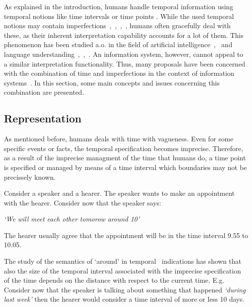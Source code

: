 %
%
As explained in the introduction, humans handle temporal information using temporal notions like time intervals or time points \cite{Dyreson1994}. While the used temporal notions may contain imperfections~\cite{Dev98},~\cite{Dubois:jucs_9_9:fuzziness_and_uncertainty_in},~\cite{nagypal2003},~\cite{Dubois89}, humans often gracefully deal with these, as their inherent interpretation capability accounts for a lot of them. This phenomenon has been studied a.o. in the field of artificial intelligence~\cite{Tre97},~\cite{5151} and language understanding~\cite{DeCaluwe:1997:FTI:285506.285516},~\cite{nagypal2003},~\cite{Dev98}. An information system, however, cannot appeal to a similar interpretation functionality. Thus, many proposals have been concerned with the combination of time and imperfections in the context of information systems~\cite{nagypal2003}. In this section, some main concepts and issues concerning this combination are presented.


\subsection{\label{subsec:representation}Representation}

As mentioned before, humans deals with time with vagueness. Even for some specific events or facts, the temporal specification becomes imprecise. Therefore, as a result of the imprecise managment of the time that humans do, a time point is specified or managed by means of a time interval which boundaries may not be precissely known.

\begin{example}
Consider a speaker and a hearer. The speaker wants to make an appointment with the hearer. Consider now that the speaker says:\\
\begin{center}
\emph{`We will meet each other tomorow around 10'}\\
\end{center}
The hearer usually agree that the appointment will be in the time interval 9.55 to 10.05.
\end{example}

The study of the semantics of `around' in temporal~\cite{Dev98} indications has shown that also the size of the temporal interval associated with the imprecise specification of the time depends on the distance with respect to the current time. E.g. Consider now that the speaker is talking about something that happened \emph{`during last week'} then the hearer would consider a time interval of more or less 10 days. 


